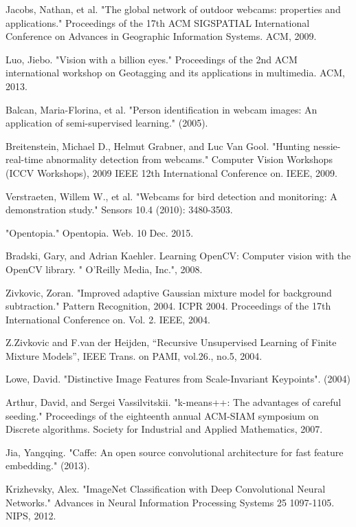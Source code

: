 \documentclass[10pt]{article} %
\begin{document}
\begin{thebibliography}{10}
Jacobs, Nathan, et al. "The global network of outdoor webcams: properties and applications." Proceedings of the 17th ACM SIGSPATIAL International Conference on Advances in Geographic Information Systems. ACM, 2009.

Luo, Jiebo. "Vision with a billion eyes." Proceedings of the 2nd ACM international workshop on Geotagging and its applications in multimedia. ACM, 2013.

Balcan, Maria-Florina, et al. "Person identification in webcam images: An application of semi-supervised learning." (2005).

Breitenstein, Michael D., Helmut Grabner, and Luc Van Gool. "Hunting nessie-real-time abnormality detection from webcams." Computer Vision Workshops (ICCV Workshops), 2009 IEEE 12th International Conference on. IEEE, 2009.

Verstraeten, Willem W., et al. "Webcams for bird detection and monitoring: A demonstration study." Sensors 10.4 (2010): 3480-3503.

"Opentopia." Opentopia. Web. 10 Dec. 2015.

Bradski, Gary, and Adrian Kaehler. Learning OpenCV: Computer vision with the OpenCV library. " O'Reilly Media, Inc.", 2008.

Zivkovic, Zoran. "Improved adaptive Gaussian mixture model for background subtraction." Pattern Recognition, 2004. ICPR 2004. Proceedings of the 17th International Conference on. Vol. 2. IEEE, 2004.

Z.Zivkovic and F.van der Heijden, “Recursive Unsupervised Learning of Finite Mixture Models”, IEEE Trans. on PAMI, vol.26., no.5, 2004.

Lowe, David. "Distinctive Image Features from Scale-Invariant Keypoints". (2004)

Arthur, David, and Sergei Vassilvitskii. "k-means++: The advantages of careful seeding." Proceedings of the eighteenth annual ACM-SIAM symposium on Discrete algorithms. Society for Industrial and Applied Mathematics, 2007.

Jia, Yangqing. "Caffe: An open source convolutional architecture for fast feature embedding." (2013).

Krizhevsky, Alex. "ImageNet Classification with Deep Convolutional Neural Networks." Advances in Neural Information Processing Systems 25 1097-1105. NIPS, 2012.




\end{thebibliography}
\end{document}
